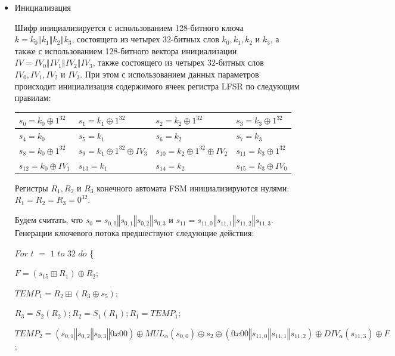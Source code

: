 \documentclass{./civarticle}
\begin{document}
\begin{itemize}
    \item Инициализация

Шифр инициализируется с использованием 128-битного ключа $k = k_0 \mathbin\Vert k_1 \mathbin\Vert k_2 \mathbin\Vert k_3$, состоящего из четырех 32-битных слов $k_0, k_1, k_2$ и $k_3$, а также с использованием 128-битного вектора инициализации $IV = IV_0 \mathbin\Vert IV_1 \mathbin\Vert IV_2 \mathbin\Vert IV_3$, также состоящего из четырех 32-битных слов $IV_0, IV_1, IV_2$ и $IV_3$. При этом с использованием данных параметров происходит инициализация содержимого ячеек регистра LFSR по следующим правилам:
\begin{longtable}{|p{2.5cm}|p{2.5cm}|p{2.5cm}|p{2.5cm}|}
\hline
$s_0 = k_0 \oplus 1^{32}$ & $s_1 = k_1 \oplus 1^{32}$ & $s_2 = k_2 \oplus 1^{32}$ & $s_3 = k_3 \oplus 1^{32}$ \\
\hline
$s_4 = k_0$ & $s_5 = k_1$ & $s_6 = k_2$ & $s_7 = k_3$ \\
\hline
$s_8 = k_0 \oplus 1^{32}$ & $s_9 = k_1 \oplus 1^{32} \oplus IV_3$ & $s_{10} = k_2 \oplus 1^{32} \oplus IV_2$ & $s_{11} = k_3 \oplus 1^{32}$ \\
\hline
$s_{12} = k_0 \oplus IV_1$ & $s_{13} = k_1$ & $s_{14} = k_2$ & $s_{15} = k_3 \oplus IV_0$ \\
\hline
\end{longtable}

Регистры $R_1, R_2$ и $R_3$ конечного автомата FSM инициализируются нулями: $R_1 = R_2 = R_3 = 0^{32}$.

Будем считать, что $s_0 = s_{0, 0} \mathbin\Vert s_{0, 1} \mathbin\Vert s_{0, 2} \mathbin\Vert s_{0, 3}$ и $s_{11} = s_{11, 0} \mathbin\Vert s_{11, 1} \mathbin\Vert s_{11, 2} \mathbin\Vert s_{11, 3}$. Генерации ключевого потока предшествуют следующие действия:

$For$ $t$ $=$ $1$ $to$ $32$ $do$ \{ 
    
    \hspace{0.5cm}$F = (s_{15} \boxplus R_1) \oplus R_2$;
    
    \hspace{0.5cm}$TEMP_1 = R_2 \boxplus (R_3 \oplus s_5)$;
    
    \hspace{0.5cm}$R_3 = S_2(R_2); R_2 = S_1(R_1); R_1 = TEMP_1$;

    \hspace{0.5cm}$TEMP_2 = (s_{0, 1} \mathbin\Vert s_{0, 2} \mathbin\Vert s_{0, 3} \mathbin\Vert 0x00) \oplus MUL_\alpha(s_{0, 0}) \oplus s_2 \oplus (0x00 \mathbin\Vert s_{11, 0} \mathbin\Vert s_{11, 1} \mathbin\Vert s_{11, 2}) \oplus DIV_\alpha(s_{11, 3}) \oplus F$;


\end{itemize}
\end{document}
